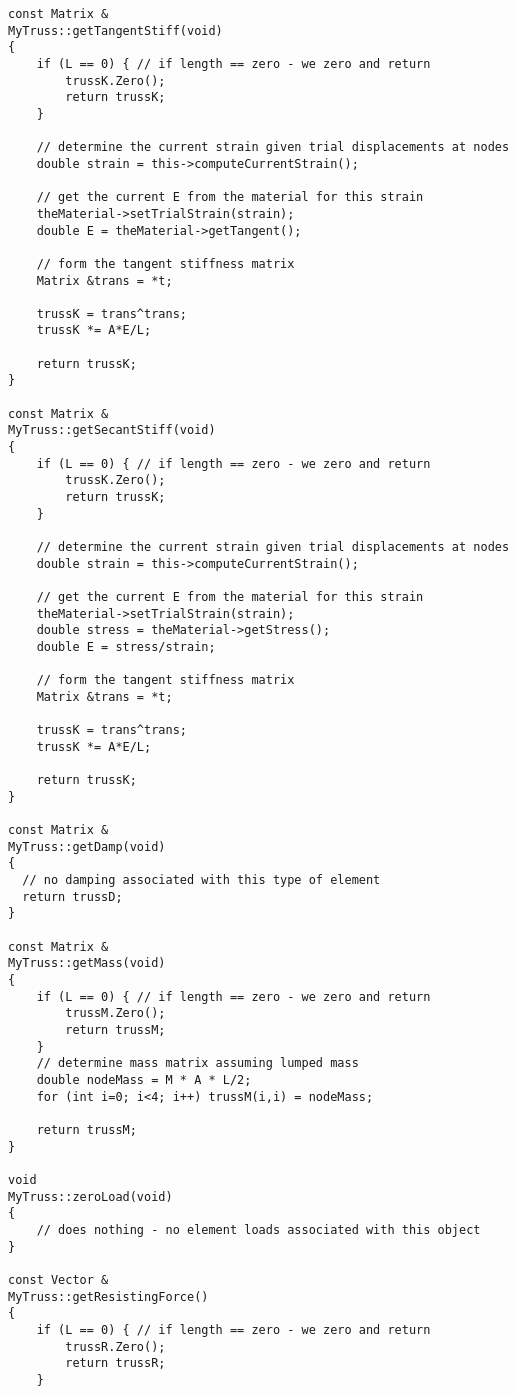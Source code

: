 \documentclass[12pt]{article}
\begin{document}
{\sf\small
\begin{verbatim}
const Matrix &
MyTruss::getTangentStiff(void)
{
    if (L == 0) { // if length == zero - we zero and return
        trussK.Zero();
        return trussK;
    }

    // determine the current strain given trial displacements at nodes
    double strain = this->computeCurrentStrain();

    // get the current E from the material for this strain
    theMaterial->setTrialStrain(strain);
    double E = theMaterial->getTangent();

    // form the tangent stiffness matrix
    Matrix &trans = *t;

    trussK = trans^trans;
    trussK *= A*E/L;  

    return trussK;
}

const Matrix &
MyTruss::getSecantStiff(void)
{
    if (L == 0) { // if length == zero - we zero and return
        trussK.Zero();
        return trussK;
    }

    // determine the current strain given trial displacements at nodes
    double strain = this->computeCurrentStrain();

    // get the current E from the material for this strain
    theMaterial->setTrialStrain(strain);
    double stress = theMaterial->getStress();    
    double E = stress/strain;

    // form the tangent stiffness matrix
    Matrix &trans = *t;

    trussK = trans^trans;
    trussK *= A*E/L;  

    return trussK;
}
    
const Matrix &
MyTruss::getDamp(void)
{
  // no damping associated with this type of element
  return trussD;
}

const Matrix &
MyTruss::getMass(void)
{ 
    if (L == 0) { // if length == zero - we zero and return
        trussM.Zero();
        return trussM;
    }
    // determine mass matrix assuming lumped mass
    double nodeMass = M * A * L/2;
    for (int i=0; i<4; i++) trussM(i,i) = nodeMass;

    return trussM;
}

void 
MyTruss::zeroLoad(void)
{
    // does nothing - no element loads associated with this object
}

const Vector &
MyTruss::getResistingForce()
{	
    if (L == 0) { // if length == zero - we zero and return
        trussR.Zero();
        return trussR;
    }
	

\end{verbatim}}
\end{document}
